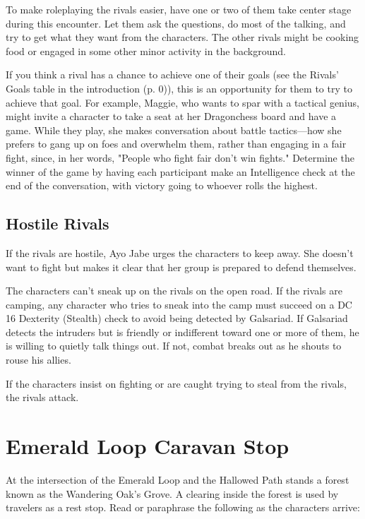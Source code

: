 \documentclass[letterpaper, 11pt, bg=full, twocolumn]{dndbook}
\begin{document}
To make roleplaying the rivals easier, have one or two of them take center stage during this encounter. Let them ask the questions, do most of the talking, and try to get what they want from the characters. The other rivals might be cooking food or engaged in some other minor activity in the background.

If you think a rival has a chance to achieve one of their goals (see the Rivals' Goals table in the introduction (p. 0)), this is an opportunity for them to try to achieve that goal. For example, Maggie, who wants to spar with a tactical genius, might invite a character to take a seat at her Dragonchess board and have a game. While they play, she makes conversation about battle tactics---how she prefers to gang up on foes and overwhelm them, rather than engaging in a fair fight, since, in her words, "People who fight fair don't win fights." Determine the winner of the game by having each participant make an Intelligence check at the end of the conversation, with victory going to whoever rolls the highest.

\subsection{Hostile Rivals}

If the rivals are hostile, Ayo Jabe urges the characters to keep away. She doesn't want to fight but makes it clear that her group is prepared to defend themselves.

The characters can't sneak up on the rivals on the open road. If the rivals are camping, any character who tries to sneak into the camp must succeed on a DC 16 Dexterity (Stealth) check to avoid being detected by Galsariad. If Galsariad detects the intruders but is friendly or indifferent toward one or more of them, he is willing to quietly talk things out. If not, combat breaks out as he shouts to rouse his allies.

If the characters insist on fighting or are caught trying to steal from the rivals, the rivals attack.
\section{Emerald Loop Caravan Stop}

At the intersection of the Emerald Loop and the Hallowed Path stands a forest known as the Wandering Oak's Grove. A clearing inside the forest is used by travelers as a rest stop. Read or paraphrase the following as the characters arrive:
\end{document}
